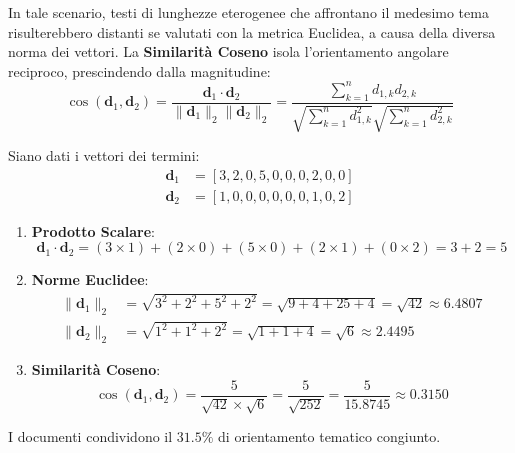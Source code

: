 In tale scenario, testi di lunghezze eterogenee che affrontano il medesimo tema risulterebbero distanti se valutati con la metrica Euclidea, a causa della diversa norma dei vettori. La \textbf{Similarità Coseno} isola l'orientamento angolare reciproco, prescindendo dalla magnitudine:
\begin{equation}
    \cos(\mathbf{d}_1, \mathbf{d}_2) = \frac{\mathbf{d}_1 \cdot \mathbf{d}_2}{\|\mathbf{d}_1\|_2 \|\mathbf{d}_2\|_2} = \frac{\sum_{k=1}^n d_{1,k} d_{2,k}}{\sqrt{\sum_{k=1}^n d_{1,k}^2} \sqrt{\sum_{k=1}^n d_{2,k}^2}}
    \label{eq:dm-cosine}
\end{equation}

\begin{example}
Siano dati i vettori dei termini:
\begin{align}
    \mathbf{d}_1 &= [3, 2, 0, 5, 0, 0, 0, 2, 0, 0] \\
    \mathbf{d}_2 &= [1, 0, 0, 0, 0, 0, 0, 1, 0, 2]
\end{align}
\begin{enumerate}
    \item \textbf{Prodotto Scalare}:
    \begin{equation}
        \mathbf{d}_1 \cdot \mathbf{d}_2 = (3 \times 1) + (2 \times 0) + (5 \times 0) + (2 \times 1) + (0 \times 2) = 3 + 2 = 5
    \end{equation}
    \item \textbf{Norme Euclidee}:
    \begin{align}
        \|\mathbf{d}_1\|_2 &= \sqrt{3^2 + 2^2 + 5^2 + 2^2} = \sqrt{9 + 4 + 25 + 4} = \sqrt{42} \approx 6.4807 \\
        \|\mathbf{d}_2\|_2 &= \sqrt{1^2 + 1^2 + 2^2} = \sqrt{1 + 1 + 4} = \sqrt{6} \approx 2.4495
    \end{align}
    \item \textbf{Similarità Coseno}:
    \begin{equation}
        \cos(\mathbf{d}_1, \mathbf{d}_2) = \frac{5}{\sqrt{42} \times \sqrt{6}} = \frac{5}{\sqrt{252}} = \frac{5}{15.8745} \approx 0.3150
    \end{equation}
\end{enumerate}
I documenti condividono il $31.5\%$ di orientamento tematico congiunto.
\end{example}

